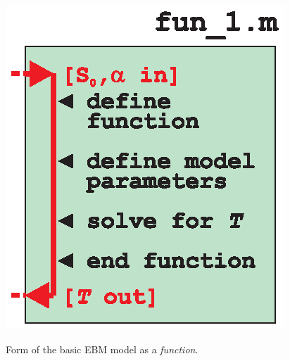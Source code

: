 \documentclass{tufte-book} %
\begin{document}
\begin{marginfigure}[-0.0in]
\includegraphics[width=\linewidth]{ch8-schematic-fun1.eps}
\caption{Form of the basic EBM model as a \textit{function}.}
\label{fig:ch8-schematic-fun1}
\end{marginfigure}
\end{document}

